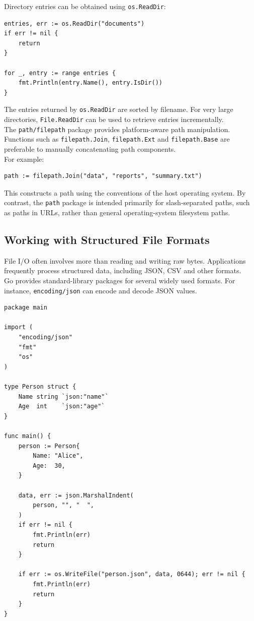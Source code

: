 Directory entries can be obtained using \texttt{os.ReadDir}:

\begin{lstlisting}
entries, err := os.ReadDir("documents")
if err != nil {
    return
}

for _, entry := range entries {
    fmt.Println(entry.Name(), entry.IsDir())
}
\end{lstlisting}

The entries returned by \texttt{os.ReadDir} are sorted by filename. For very large directories, \texttt{File.ReadDir} can be used to retrieve entries incrementally.\\

The \texttt{path/filepath} package provides platform-aware path manipulation. Functions such as \texttt{filepath.Join}, \texttt{filepath.Ext} and \texttt{filepath.Base} are preferable to manually concatenating path components.\\

For example:

\begin{lstlisting}
path := filepath.Join("data", "reports", "summary.txt")
\end{lstlisting}

This constructs a path using the conventions of the host operating system. By contrast, the \texttt{path} package is intended primarily for slash-separated paths, such as paths in URLs, rather than general operating-system filesystem paths.\\

\subsection{Working with Structured File Formats}

File I/O often involves more than reading and writing raw bytes. Applications frequently process structured data, including JSON, CSV and other formats.\\

Go provides standard-library packages for several widely used formats. For instance, \texttt{encoding/json} can encode and decode JSON values.

\begin{lstlisting}
package main

import (
    "encoding/json"
    "fmt"
    "os"
)

type Person struct {
    Name string `json:"name"`
    Age  int    `json:"age"`
}

func main() {
    person := Person{
        Name: "Alice",
        Age:  30,
    }

    data, err := json.MarshalIndent(
        person, "", "  ",
    )
    if err != nil {
        fmt.Println(err)
        return
    }

    if err := os.WriteFile("person.json", data, 0644); err != nil {
        fmt.Println(err)
        return
    }
}
\end{lstlisting}

